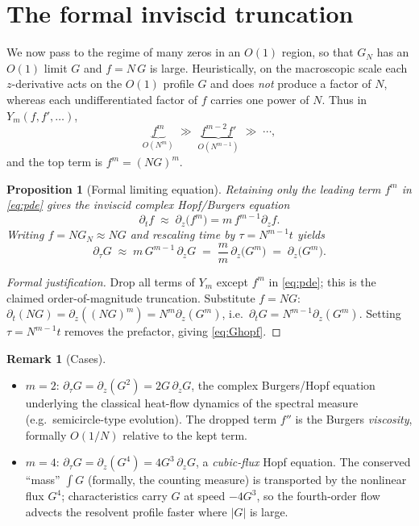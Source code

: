 \documentclass[11pt]{article}
\theoremstyle{plain}
\newtheorem{proposition}{Proposition}
\theoremstyle{definition}
\newtheorem{remark}{Remark}
\newcommand{\dt}{\partial_t}
\newcommand{\dz}{\partial_z}
\newcommand{\GN}{G_N}
\begin{document}
\section{The formal inviscid truncation}

We now pass to the regime of many zeros in an $O(1)$ region, so that $\GN$ has
an $O(1)$ limit $G$ and $f=N\,G$ is large. Heuristically, on the macroscopic
scale each $z$-derivative acts on the $O(1)$ profile $G$ and does \emph{not}
produce a factor of $N$, whereas each undifferentiated factor of $f$ carries one
power of $N$. Thus in $Y_m(f,f',\dots)$,
\[
  \underbrace{f^m}_{O(N^m)}\;\gg\;
  \underbrace{f^{m-2}f'}_{O(N^{m-1})}\;\gg\;\cdots,
\]
and the top term is $f^m=(NG)^m$.

\begin{proposition}[Formal limiting equation]\label{prop:burgers}
Retaining only the leading term $f^m$ in \eqref{eq:pde} gives the inviscid
complex Hopf/Burgers equation
\begin{equation}\label{eq:hopf}
  \dt f\;\approx\;\dz\bigl(f^m\bigr)=m\,f^{m-1}\dz f .
\end{equation}
Writing $f=N\GN\approx N G$ and rescaling time by $\tau=N^{m-1}t$ yields
\begin{equation}\label{eq:Ghopf}
  \partial_\tau G\;\approx\;m\,G^{m-1}\,\dz G
                \;=\;\frac{m}{m}\,\dz\bigl(G^{m}\bigr)
                \;=\;\dz\bigl(G^{m}\bigr).
\end{equation}
\end{proposition}

\begin{proof}[Formal justification]
Drop all terms of $Y_m$ except $f^m$ in \eqref{eq:pde}; this is the claimed
order-of-magnitude truncation. Substitute $f=NG$:
$\dt(NG)=\dz((NG)^m)=N^m\dz(G^m)$, i.e.\ $\dt G=N^{m-1}\dz(G^m)$. Setting
$\tau=N^{m-1}t$ removes the prefactor, giving \eqref{eq:Ghopf}.
\end{proof}

\begin{remark}[Cases]
\begin{itemize}
  \item $m=2$: $\partial_\tau G=\dz(G^2)=2G\,\dz G$, the complex Burgers/Hopf
    equation underlying the classical heat-flow dynamics of the spectral
    measure (e.g.\ semicircle-type evolution). The dropped term $f''$ is the
    Burgers \emph{viscosity}, formally $O(1/N)$ relative to the kept term.
  \item $m=4$: $\partial_\tau G=\dz(G^4)=4G^3\,\dz G$, a \emph{cubic-flux} Hopf
    equation. The conserved ``mass'' $\int G$ (formally, the counting measure)
    is transported by the nonlinear flux $G^4$; characteristics carry $G$ at
    speed $-4G^3$, so the fourth-order flow advects the resolvent profile
    faster where $|G|$ is large.
\end{itemize}
\end{remark}
\end{document}
